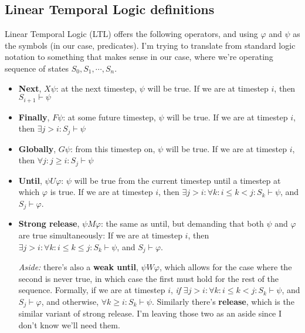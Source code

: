 \documentclass{article}
\begin{document}
\subsection{Linear Temporal Logic definitions}
Linear Temporal Logic (LTL) offers the following operators, and using $\varphi$ and $\psi$ as the symbols (in our case, predicates).
I'm trying to translate from standard logic notation to something that makes sense in our case, where we're operating sequence of states $S_0, S_1, \cdots, S_n$.
\begin{itemize}
    \item \textbf{Next}, $X \psi$: at the next timestep, $\psi$ will be true. If we are at timestep $i$, then $S_{i+1} \vdash \psi$

    \item \textbf{Finally}, $F \psi$: at some future timestep, $\psi$ will be true. If we are at timestep $i$, then $\exists j > i:  S_{j} \vdash \psi$

    \item \textbf{Globally}, $G \psi$: from this timestep on, $\psi$ will be true. If we are at timestep $i$, then $\forall j: j \geq i: S_{j} \vdash \psi$

    \item \textbf{Until}, $\psi U \varphi$: $\psi$ will be true from the current timestep until a timestep at which $\varphi$ is true. If we are at timestep $i$, then $\exists j > i: \forall k: i \leq k < j: S_k \vdash \psi$, and $S_j \vdash \varphi$.
    \item \textbf{Strong release}, $\psi M \varphi$: the same as until, but demanding that both $\psi$ and $\varphi$ are true simultaneously: If we are at timestep $i$, then $\exists j > i: \forall k: i \leq k \leq j: S_k \vdash \psi$, and $S_j \vdash \varphi$.

    \textit{Aside:} there's also a \textbf{weak until}, $\psi W \varphi$, which allows for the case where the second is never true, in which case the first must hold for the rest of the sequence. Formally, if we are at timestep $i$, \textit{if} $\exists j > i: \forall k: i \leq k < j: S_k \vdash \psi$, and $S_j \vdash \varphi$, and otherwise, $\forall k \geq i: S_k \vdash \psi$. Similarly there's \textbf{release}, which is the similar variant of strong release. I'm leaving those two as an aside since I don't know we'll need them.

\end{itemize}
\end{document}
